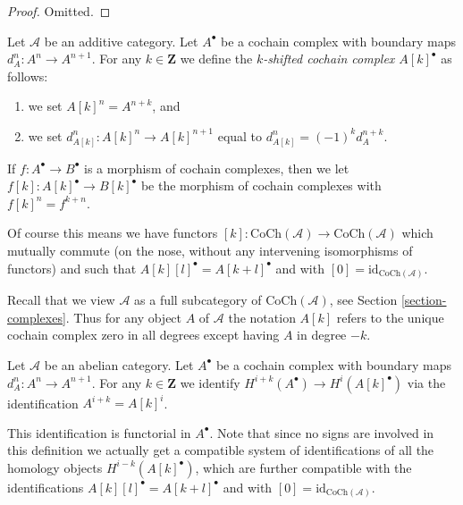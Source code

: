 \begin{proof}
Omitted.
\end{proof}

\begin{definition}
\label{definition-shift-cochain}
Let $\mathcal{A}$ be an additive category.
Let $A^\bullet$ be a cochain complex
with boundary maps $d_A^n : A^n \to A^{n + 1}$.
For any $k \in \mathbf{Z}$ we define the
{\it $k$-shifted cochain complex $A[k]^\bullet$}
as follows:
\begin{enumerate}
\item we set $A[k]^n = A^{n + k}$, and
\item we set $d_{A[k]}^n : A[k]^n \to A[k]^{n + 1}$
equal to $d_{A[k]}^n = (-1)^k d_A^{n + k}$.
\end{enumerate}
If $f : A^\bullet \to B^\bullet$ is a morphism of
cochain complexes, then we let
$f[k] : A[k]^\bullet \to B[k]^\bullet$ be the
morphism of cochain complexes with
$f[k]^n = f^{k + n}$.
\end{definition}

\noindent
Of course this means we have functors
$[k] : \text{CoCh}(\mathcal{A}) \to \text{CoCh}(\mathcal{A})$
which mutually commute (on the nose, without
any intervening isomorphisms of functors) and
such that $A[k][l]^\bullet = A[k + l]^\bullet$ and
with $[0] = \text{id}_{\text{CoCh}(\mathcal{A})}$.

\medskip\noindent
Recall that we view $\mathcal{A}$ as a full subcategory of
$\text{CoCh}(\mathcal{A})$, see Section \ref{section-complexes}.
Thus for any object $A$ of $\mathcal{A}$ the notation $A[k]$
refers to the unique cochain complex zero in all degrees except having
$A$ in degree $-k$.

\begin{definition}
\label{definition-cohomology-shift}
Let $\mathcal{A}$ be an abelian category.
Let $A^\bullet$ be a cochain complex
with boundary maps $d_A^n : A^n \to A^{n + 1}$.
For any $k \in \mathbf{Z}$ we identify
{\it $H^{i + k}(A^\bullet) \longrightarrow H^i(A[k]^\bullet)$}
via the identification $A^{i + k} = A[k]^i$.
\end{definition}

\noindent
This identification is functorial in $A^\bullet$.
Note that since no signs are involved in this
definition we actually get a compatible system
of identifications of all the homology
objects $H^{i - k}(A[k]^\bullet)$, which are
further compatible with the identifications
$A[k][l]^\bullet = A[k + l]^\bullet$ and
with $[0] = \text{id}_{\text{CoCh}(\mathcal{A})}$.

